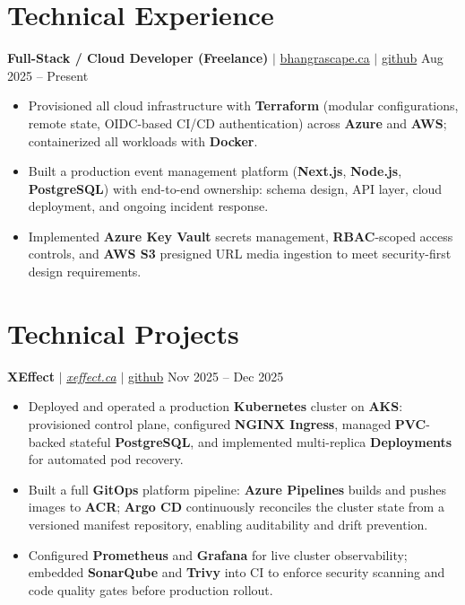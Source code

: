 \documentclass[11pt,a4paper]{article}
\begin{document}
\section{Technical Experience}

\textbf{Full-Stack / Cloud Developer (Freelance)} $|$ \href{https://bhangrascape.ca}{bhangrascape.ca} $|$ \href{https://github.com/bhat0155/bhangraescape}{\small github} \hfill Aug 2025 -- Present
\begin{itemize}
    \item Provisioned all cloud infrastructure with \textbf{Terraform} (modular configurations, remote state, OIDC-based CI/CD authentication) across \textbf{Azure} and \textbf{AWS}; containerized all workloads with \textbf{Docker}.
    \item Built a production event management platform (\textbf{Next.js}, \textbf{Node.js}, \textbf{PostgreSQL}) with end-to-end ownership: schema design, API layer, cloud deployment, and ongoing incident response.
    \item Implemented \textbf{Azure Key Vault} secrets management, \textbf{RBAC}-scoped access controls, and \textbf{AWS S3} presigned URL media ingestion to meet security-first design requirements.
\end{itemize}

\section{Technical Projects}

\textbf{XEffect} $|$ \href{https://www.xeffect.ca/app}{\emph{xeffect.ca}} $|$ \href{https://github.com/bhat0155/xeffect}{\small github} \hfill Nov 2025 -- Dec 2025
\begin{itemize}
    \item Deployed and operated a production \textbf{Kubernetes} cluster on \textbf{AKS}: provisioned control plane, configured \textbf{NGINX Ingress}, managed \textbf{PVC}-backed stateful \textbf{PostgreSQL}, and implemented multi-replica \textbf{Deployments} for automated pod recovery.
    \item Built a full \textbf{GitOps} platform pipeline: \textbf{Azure Pipelines} builds and pushes images to \textbf{ACR}; \textbf{Argo CD} continuously reconciles the cluster state from a versioned manifest repository, enabling auditability and drift prevention.
    \item Configured \textbf{Prometheus} and \textbf{Grafana} for live cluster observability; embedded \textbf{SonarQube} and \textbf{Trivy} into CI to enforce security scanning and code quality gates before production rollout.
\end{itemize}
\end{document}
